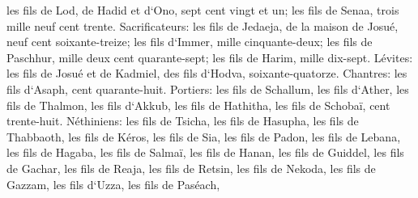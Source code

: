 \verse les fils de Lod, de Hadid et d`Ono, sept cent vingt et un; 
\verse les fils de Senaa, trois mille neuf cent trente. 
\verse Sacrificateurs: les fils de Jedaeja, de la maison de Josué, neuf cent soixante-treize; 
\verse les fils d`Immer, mille cinquante-deux; 
\verse les fils de Paschhur, mille deux cent quarante-sept; 
\verse les fils de Harim, mille dix-sept. 
\verse Lévites: les fils de Josué et de Kadmiel, des fils d`Hodva, soixante-quatorze. 
\verse Chantres: les fils d`Asaph, cent quarante-huit. 
\verse Portiers: les fils de Schallum, les fils d`Ather, les fils de Thalmon, les fils d`Akkub, les fils de Hathitha, les fils de Schobaï, cent trente-huit. 
\verse Néthiniens: les fils de Tsicha, les fils de Hasupha, les fils de Thabbaoth, 
\verse les fils de Kéros, les fils de Sia, les fils de Padon, 
\verse les fils de Lebana, les fils de Hagaba, les fils de Salmaï, 
\verse les fils de Hanan, les fils de Guiddel, les fils de Gachar, 
\verse les fils de Reaja, les fils de Retsin, les fils de Nekoda, 
\verse les fils de Gazzam, les fils d`Uzza, les fils de Paséach, 
